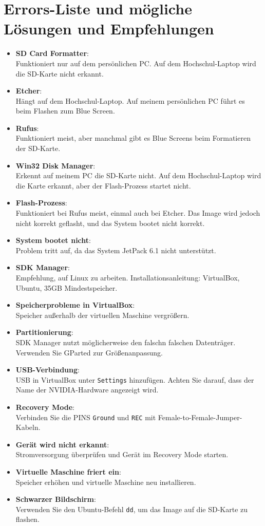 \documentclass{article}
\begin{document}
\section{Errors-Liste und mögliche Lösungen und Empfehlungen}
\begin{itemize}
    \item \textbf{SD Card Formatter}: \\Funktioniert nur auf dem persönlichen PC. Auf dem Hochschul-Laptop wird die SD-Karte nicht erkannt.
    \item \textbf{Etcher}: \\Hängt auf dem Hochschul-Laptop. Auf meinem persönlichen PC führt es beim Flashen zum Blue Screen.
    \item \textbf{Rufus}: \\Funktioniert meist, aber manchmal gibt es Blue Screens beim Formatieren der SD-Karte.
    \item \textbf{Win32 Disk Manager}: \\Erkennt auf meinem PC die SD-Karte nicht. Auf dem Hochschul-Laptop wird die Karte erkannt, aber der Flash-Prozess startet nicht.
    \item \textbf{Flash-Prozess}: \\Funktioniert bei Rufus meist, einmal auch bei Etcher. Das Image wird jedoch nicht korrekt geflasht, und das System bootet nicht korrekt.
    \item \textbf{System bootet nicht}: \\Problem tritt auf, da das System JetPack 6.1 nicht unterstützt.
    \item \textbf{SDK Manager}: \\Empfehlung, auf Linux zu arbeiten. Installationsanleitung: VirtualBox, Ubuntu, 35GB Mindestspeicher.
    \item \textbf{Speicherprobleme in VirtualBox}: \\Speicher außerhalb der virtuellen Maschine vergrößern.
    \item \textbf{Partitionierung}: \\SDK Manager nutzt möglicherweise den falschn falschen Datenträger. Verwenden Sie GParted zur Größenanpassung.
    \item \textbf{USB-Verbindung}: \\USB in VirtualBox unter \texttt{Settings} hinzufügen. Achten Sie darauf, dass der Name der NVIDIA-Hardware angezeigt wird.
    \item \textbf{Recovery Mode}: \\Verbinden Sie die PINS \texttt{Ground} und \texttt{REC} mit Female-to-Female-Jumper-Kabeln.
    \item \textbf{Gerät wird nicht erkannt}: \\Stromversorgung überprüfen und Gerät im Recovery Mode starten.
    \item \textbf{Virtuelle Maschine friert ein}: \\Speicher erhöhen und virtuelle Maschine neu installieren.
    \item \textbf{Schwarzer Bildschirm}: \\Verwenden Sie den Ubuntu-Befehl \texttt{dd}, um das Image auf die SD-Karte zu flashen.
\end{itemize}
\end{document}
